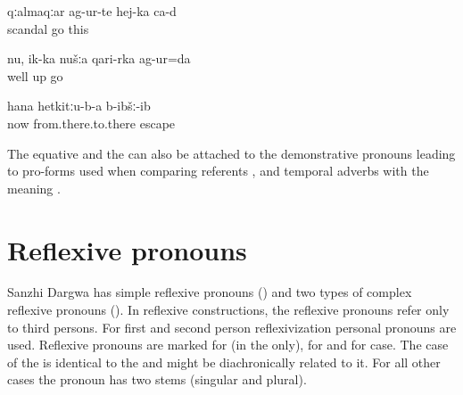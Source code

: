 \begin{exe}
	\ex	\label{ex:From here the scandal happened}
	\gll	qːalmaqːar	ag-ur-te	hej-ka	ca-d\\
		scandal	go 	this	\\
	\glt	{}

	\ex	\label{ex:Well we went from up there along the upper side}
	\gll	nu,	ik-ka	nušːa	qari-rka	ag-ur=da\\
		well			up	go\\
	\glt	{}

	\ex	\label{ex:(The dog) ran away to that side (from there to there)}
	\gll	hana	hetkitːu-b-a	b-ibšː-ib\\
		now	from.there.to.there	escape\\
	\glt	{}
\end{exe}
%
The equative    and the    can also be attached to the demonstrative pronouns leading to pro-forms used when comparing referents ,  and temporal adverbs with the meaning  .



\section{Reflexive pronouns}
\label{sec:Reflexive pronouns}

Sanzhi Dargwa has simple reflexive pronouns () and two types of complex reflexive pronouns (). In reflexive constructions, the reflexive pronouns refer only to third persons. For first and second person reflexivization personal pronouns are used. Reflexive pronouns are marked for  (in the  only), for  and for case. The  case of the  is identical to the  and might be diachronically related to it. For all other cases the pronoun has two stems (singular and plural).

